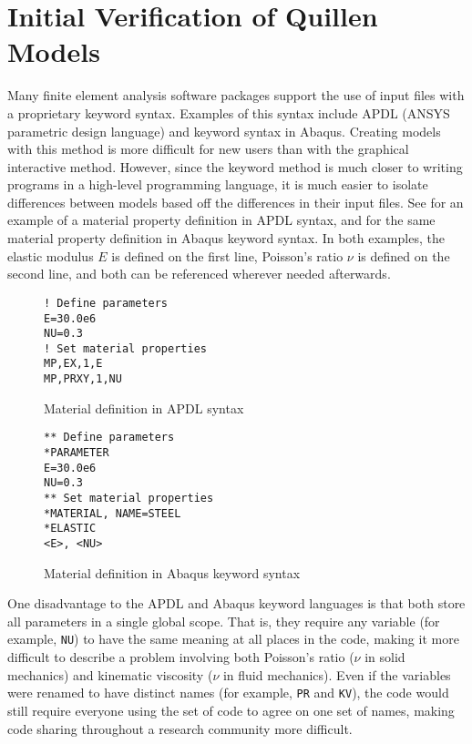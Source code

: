 \chapter{Initial Verification of Quillen Models} \label{chap:app-quillen-rework}

Many finite element analysis software packages support the use of input files with a proprietary keyword syntax.
Examples of this syntax include APDL (ANSYS parametric design language) and keyword syntax in Abaqus.
Creating models with this method is more difficult for new users than with the graphical interactive method.
However, since the keyword method is much closer to writing programs in a high-level programming language, it is much easier to isolate differences between models based off the differences in their input files.
See  for an example of a material property definition in APDL syntax, and  for the same material property definition in Abaqus keyword syntax.
In both examples, the elastic modulus \(E\) is defined on the first line, Poisson's ratio \(\nu\) is defined on the second line, and both can be referenced wherever needed afterwards.

\begin{figure}[bp]
\begin{lstlisting}[language={APDL}]
! Define parameters
E=30.0e6
NU=0.3
! Set material properties
MP,EX,1,E
MP,PRXY,1,NU
\end{lstlisting}
\caption{Material definition in APDL syntax \label{fig:material-apdl}}
\end{figure}
\begin{figure}[bp]
\begin{lstlisting}[language={Abaqus}]
** Define parameters
*PARAMETER
E=30.0e6
NU=0.3
** Set material properties
*MATERIAL, NAME=STEEL
*ELASTIC
<E>, <NU>
\end{lstlisting}
\caption{Material definition in Abaqus keyword syntax \label{fig:material-abaqus-keyword}}
\end{figure}

One disadvantage to the APDL and Abaqus keyword languages is that both store all parameters in a single global scope.
That is, they require any variable (for example, \verb|NU|) to have the same meaning at all places in the code, making it more difficult to describe a problem involving both Poisson's ratio (\( \nu \) in solid mechanics) and kinematic viscosity (\( \nu \) in fluid mechanics).
Even if the variables were renamed to have distinct names (for example, \verb|PR| and \verb|KV|), the code would still require everyone using the set of code to agree on one set of names, making code sharing throughout a research community more difficult.

